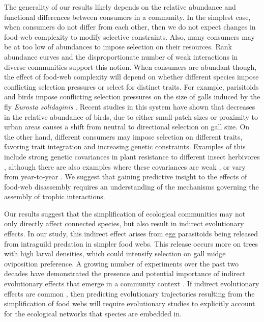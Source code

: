 \documentclass[11pt,]{article}
\begin{document}
The generality of our results likely depends on the relative abundance
and functional differences between consumers in a community. In the
simplest case, when consumers do not differ from each other, then we do
not expect changes in food-web complexity to modify selective
constraints. Also, many consumers may be at too low of abundances to
impose selection on their resources. Rank abundance curves
\citep{Preston1948} and the disproportionate number of weak interactions
in diverse communities \citep{Paine1992} support this notion. When
consumers are abundant though, the effect of food-web complexity will
depend on whether different species impose conflicting selection
pressures or select for distinct traits. For example, parisitoids and
birds impose conflicting selection pressures on the size of galls
induced by the fly \emph{Eurosta solidaginis}
\citep{Weis1985, Abrahamson1997, Start2016}. Recent studies in this
system have shown that decreases in the relative abundance of birds, due
to either small patch sizes \citep{Start2016} or proximity to urban
areas \citep{Start2018} causes a shift from neutral to directional
selection on gall size. On the other hand, different consumers may
impose selection on different traits, favoring trait integration and
increasing genetic constraints. Examples of this include strong genetic
covariances in plant resistance to different insect herbivores
\citep{Maddox1990, Wise2007, Wise2013}, although there are also examples
where these covariances are weak \citep{Roche1997, Barbour2015}, or vary
from year-to-year \citep{Johnson2007}. We suggest that gaining
predictive insight to the effects of food-web disassembly requires an
understanding of the mechanisms governing the assembly of trophic
interactions.

Our results suggest that the simplification of ecological communities
may not only directly affect connected species, but also result in
indirect evolutionary effects. In our study, this indirect effect arises
from egg parasitoids being released from intraguild predation in simpler
food webs. This release occurs more on trees with high larval densities,
which could intensify selection on gall midge oviposition preference. A
growing number of experiments over the past two decades have
demonstrated the presence and potential importance of indirect
evolutionary effects that emerge in a community context
\citep{Juenger1998, Stinchcombe2001, Lankau2007, Walsh2008, Walsh2010, terHorst2010, Sahli2011, Lau2012, terHorst2015, Schiestl2018}.
If indirect evolutionary effects are common \citep{Walsh2013}, then
predicting evolutionary trajectories resulting from the simplification
of food webs will require evolutionary studies to explicitly account for
the ecological networks that species are embedded in.
\end{document}
